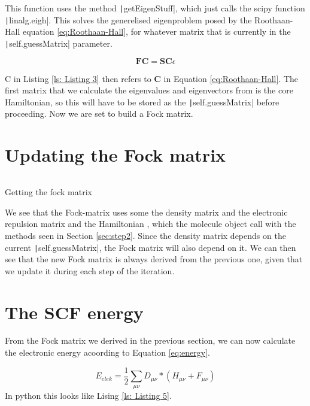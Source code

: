 \documentclass{article}
\begin{document}
This function uses the method \texttt|getEigenStuff|, which just calls the scipy function \texttt|linalg.eigh|. This solves the generelised eigenproblem posed by the Roothaan-Hall equation \eqref{eq:Roothaan-Hall}, for whatever matrix that is currently in the \texttt|self.guessMatrix| parameter.

\begin{equation}\label{eq:Roothaan-Hall}
    \boldsymbol{FC} = \boldsymbol{SC}\epsilon
\end{equation}

C in Listing \ref{ls: Listing 3} then refers to \textbf{C} in Equation \eqref{eq:Roothaan-Hall}. The first matrix that we calculate the eigenvalues and eigenvectors from is the core Hamiltonian, so this will have to be stored as the \texttt|self.guessMatrix| before proceeding. Now we are set to build a Fock matrix.

\section{Updating the Fock matrix}
\label{sec:step4}

\begin{listing}[ht]
    \centering
    \inputminted[firstline=119, lastline=124, autogobble]{python}{Hartree_FockL.py}
    \caption{Getting the fock matrix}
    \label{ls: Listing 4}
\end{listing}
 
 We see that the Fock-matrix uses some the density matrix and the electronic repulsion matrix and the Hamiltonian , which the molecule object call with the methods seen in Section \ref{sec:step2}. Since the density matrix depends on the current \texttt|self.guessMatrix|, the Fock matrix will also depend on it. We can then see that the new Fock matrix is always derived from the previous one, given that we update it during each step of the iteration.
 
 \section{The SCF energy}
 \label{sec:step5}
 From the Fock matrix we derived in the previous section, we can now calculate the electronic energy acoording to Equation \eqref{eq:energy}.
 
 \begin{equation} \label{eq:energy}
     E_{elek} = \frac{1}{2}\sum_{\mu\nu}D_{\mu\nu}*(H_{\mu\nu} + F_{\mu\nu})
 \end{equation}
 In python this looks like Lising \ref{ls: Listing 5}.
 
\end{document}
